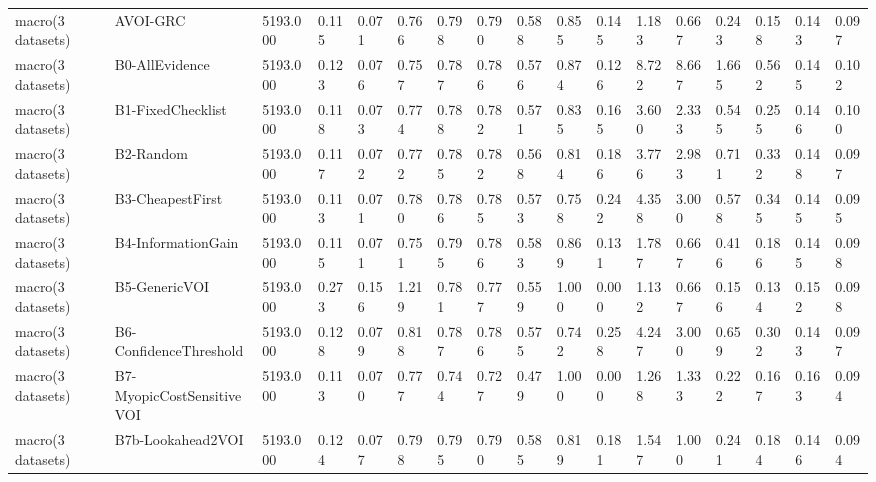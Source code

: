 \begin{table}[!ht]
{\begin{tabular}{lllllllllllllllll}
macro(3 datasets) & AVOI-GRC & 5193.000 & 0.115 & 0.071 & 0.766 & 0.798 & 0.790 & 0.588 & 0.855 & 0.145 & 1.183 & 0.667 & 0.243 & 0.158 & 0.143 & 0.097 \\
macro(3 datasets) & B0-AllEvidence & 5193.000 & 0.123 & 0.076 & 0.757 & 0.787 & 0.786 & 0.576 & 0.874 & 0.126 & 8.722 & 8.667 & 1.665 & 0.562 & 0.145 & 0.102 \\
macro(3 datasets) & B1-FixedChecklist & 5193.000 & 0.118 & 0.073 & 0.774 & 0.788 & 0.782 & 0.571 & 0.835 & 0.165 & 3.600 & 2.333 & 0.545 & 0.255 & 0.146 & 0.100 \\
macro(3 datasets) & B2-Random & 5193.000 & 0.117 & 0.072 & 0.772 & 0.785 & 0.782 & 0.568 & 0.814 & 0.186 & 3.776 & 2.983 & 0.711 & 0.332 & 0.148 & 0.097 \\
macro(3 datasets) & B3-CheapestFirst & 5193.000 & 0.113 & 0.071 & 0.780 & 0.786 & 0.785 & 0.573 & 0.758 & 0.242 & 4.358 & 3.000 & 0.578 & 0.345 & 0.145 & 0.095 \\
macro(3 datasets) & B4-InformationGain & 5193.000 & 0.115 & 0.071 & 0.751 & 0.795 & 0.786 & 0.583 & 0.869 & 0.131 & 1.787 & 0.667 & 0.416 & 0.186 & 0.145 & 0.098 \\
macro(3 datasets) & B5-GenericVOI & 5193.000 & 0.273 & 0.156 & 1.219 & 0.781 & 0.777 & 0.559 & 1.000 & 0.000 & 1.132 & 0.667 & 0.156 & 0.134 & 0.152 & 0.098 \\
macro(3 datasets) & B6-ConfidenceThreshold & 5193.000 & 0.128 & 0.079 & 0.818 & 0.787 & 0.786 & 0.575 & 0.742 & 0.258 & 4.247 & 3.000 & 0.659 & 0.302 & 0.143 & 0.097 \\
macro(3 datasets) & B7-MyopicCostSensitiveVOI & 5193.000 & 0.113 & 0.070 & 0.777 & 0.744 & 0.727 & 0.479 & 1.000 & 0.000 & 1.268 & 1.333 & 0.222 & 0.167 & 0.163 & 0.094 \\
macro(3 datasets) & B7b-Lookahead2VOI & 5193.000 & 0.124 & 0.077 & 0.798 & 0.795 & 0.790 & 0.585 & 0.819 & 0.181 & 1.547 & 1.000 & 0.241 & 0.184 & 0.146 & 0.094 \\
\bottomrule
\end{tabular}}
\end{table}
